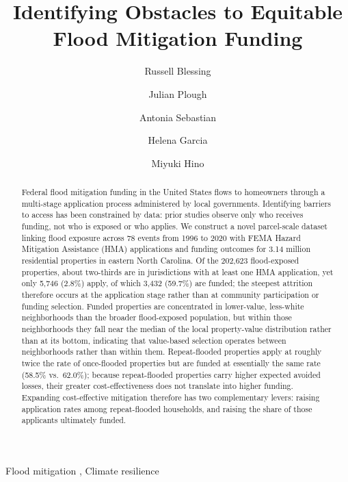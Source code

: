 \documentclass[
  authoryear,
  preprint]{elsarticle}
\begin{document}
\begin{frontmatter}
\title{Identifying Obstacles to Equitable Flood Mitigation Funding}
\author[1]{Russell Blessing%
%
}

\author[2]{Julian Plough%
%
}

\author[1,2]{Antonia Sebastian%
%
}

\author[2]{Helena Garcia%
%
}

\author[1,2]{Miyuki Hino%
%
}






        
\begin{abstract}
Federal flood mitigation funding in the United States flows to
homeowners through a multi-stage application process administered by
local governments. Identifying barriers to access has been constrained
by data: prior studies observe only who receives funding, not who is
exposed or who applies. We construct a novel parcel-scale dataset
linking flood exposure across 78 events from 1996 to 2020 with FEMA
Hazard Mitigation Assistance (HMA) applications and funding outcomes for
3.14 million residential properties in eastern North Carolina. Of the
202,623 flood-exposed properties, about two-thirds are in jurisdictions
with at least one HMA application, yet only 5,746 (2.8\%) apply, of
which 3,432 (59.7\%) are funded; the steepest attrition therefore occurs
at the application stage rather than at community participation or
funding selection. Funded properties are concentrated in lower-value,
less-white neighborhoods than the broader flood-exposed population, but
within those neighborhoods they fall near the median of the local
property-value distribution rather than at its bottom, indicating that
value-based selection operates between neighborhoods rather than within
them. Repeat-flooded properties apply at roughly twice the rate of
once-flooded properties but are funded at essentially the same rate
(58.5\% vs.~62.0\%); because repeat-flooded properties carry higher
expected avoided losses, their greater cost-effectiveness does not
translate into higher funding. Expanding cost-effective mitigation
therefore has two complementary levers: raising application rates among
repeat-flooded households, and raising the share of those applicants
ultimately funded.
\end{abstract}





\begin{keyword}
    Flood mitigation \sep 
    Climate resilience
\end{keyword}
\end{frontmatter}
    
\end{document}
